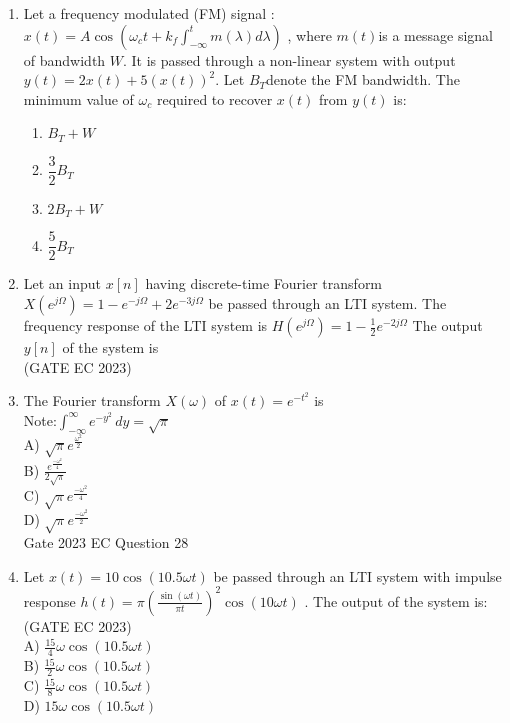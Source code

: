\begin{enumerate}[label=\thechapter.\arabic*,ref=\thechapter.\theenumi]
\item Let a frequency modulated (FM) signal : $ x(t) = A \cos(\omega_c t + k_f \int_{-\infty}^{t} m(\lambda) d\lambda)$ , where $ m(t) $is a message signal of bandwidth $ W $. It is passed through a non-linear system with output $y(t) = 2x(t) + 5(x(t))^2 $.
Let $B_T $denote the FM bandwidth. The minimum value of $ \omega_c $ required to recover $ x(t) $ from $ y(t) $ is:\\
\begin{enumerate}[label = (\Alph*)]
\item $B_T + W$ \\
\item $\dfrac{3}{2} B_T$ \\
\item $2B_T + W$ \\
\item $\dfrac{5}{2} B_T$ \\
\end{enumerate}

\solution
\newpage

\item Let an input $x[n]$ having discrete-time Fourier transform
$X(e^{j\Omega}) = 1 - e^{-j\Omega} + 2e^{-3j\Omega}$
be passed through an LTI system. The frequency response of the LTI system is 
$H(e^{j\Omega}) = 1 - \frac{1}{2} e^{-2j\Omega}$
The output $y[n]$ of the system is \\ \hfill(GATE EC 2023)
\solution 

\newpage
\item The Fourier transform $X(\omega)$ of $x(t) = e^{-t^2}$ is\\
Note:$\int_{-\infty}^{\infty} e^{-y^2} \,dy = \sqrt{\pi}$ \\  
A) $\sqrt{\pi} e^{\frac{\omega^2}{2}}$ \\
B) $\frac{e^{\frac{-\omega^2}{4}}}{2\sqrt{\pi}}$ \\
C) $\sqrt{\pi} e^{\frac{-\omega^2}{4}}$ \\
D) $\sqrt{\pi} e^{\frac{-\omega^2}{2}}$\\
\hfill Gate 2023 EC Question 28
\solution

\newpage

 \item Let $x(t) = 10 \cos(10.5 \omega t)$ be passed through an LTI system with impulse response $h(t) = \pi\left(\frac{\sin(\omega t)}{\pi t}\right)^2 \cos(10 \omega t)$ . The output of the system is:\\ \hfill(GATE EC 2023)\\
A) $\frac{15}{4}\omega \cos(10.5 \omega t)$ \\
B) $\frac{15}{2}\omega \cos(10.5 \omega t)$ \\
C) $\frac{15}{8}\omega \cos(10.5 \omega t)$ \\
D) $15\omega \cos(10.5 \omega t)$ \\
 \solution

\newpage
 

\end{enumerate}
